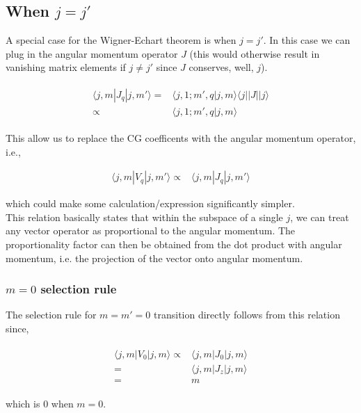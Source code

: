 \documentclass[10pt,fleqn]{article}
\newcommand{\eqar}[1]
{
  \begin{align}
    #1
  \end{align}
}
\begin{document}
\subsection{When $j=j'$}
A special case for the Wigner-Echart theorem is when $j=j'$.
In this case we can plug in the angular momentum operator $J$
(this would otherwise result in vanishing matrix elements if $j\neq j'$
since $J$ conserves, well, $j$).
\eqar{
  \begin{split}
    \langle j,m|J_q|j,m' \rangle=&\langle j,1;m',q|j,m\rangle\langle j||J||j\rangle\\
    \propto&\langle j,1;m',q|j,m\rangle
  \end{split}
}
This allow us to replace the CG coefficents with the angular momentum operator, i.e.,
\eqar{
  \label{eq:jj:prop1}
  \langle j,m|V_q|j,m'\rangle\propto&\langle j,m|J_q|j,m'\rangle
}
which could make some calculation/expression significantly simpler.\\

This relation basically states that within the subspace of a single $j$,
we can treat any vector operator as proportional to the angular momentum.
The proportionality factor can then be obtained from the dot product
with angular momentum, i.e. the projection of the vector onto angular momentum.

\subsubsection{$m=0$ selection rule}
The selection rule for $m=m'=0$ transition directly follows from this relation
since,
\eqar{
  \begin{split}
    \langle j,m|V_0|j,m\rangle\propto&\langle j,m|J_0|j,m\rangle\\
    =&\langle j,m|J_z|j,m\rangle\\
    =&m
  \end{split}
}
which is $0$ when $m=0$.
\end{document}
